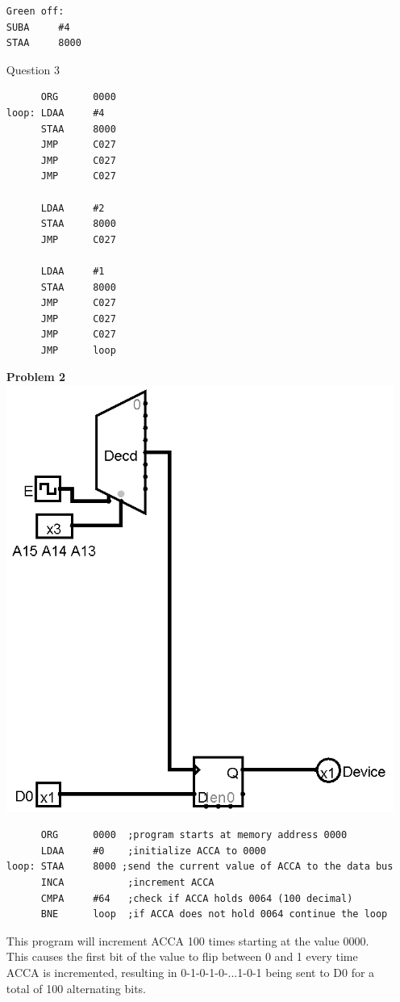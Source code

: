 \documentclass{article}
\begin{document}
\begin{itemize}
\begin{verbatim}
Green off:
SUBA     #4
STAA     8000
\end{verbatim}
	\item [Question 3]\hspace{0pt}\\
\begin{verbatim}
      ORG      0000
loop: LDAA     #4
      STAA     8000
      JMP      C027
      JMP      C027
      JMP      C027

      LDAA     #2
      STAA     8000
      JMP      C027

      LDAA     #1
      STAA     8000
      JMP      C027
      JMP      C027
      JMP      C027
      JMP      loop
\end{verbatim}
	
	\item [\textbf{Problem 2}]\hspace{0pt}\\
	\includegraphics[scale=0.5]{hw8b}
\begin{verbatim}
      ORG      0000  ;program starts at memory address 0000
      LDAA     #0    ;initialize ACCA to 0000
loop: STAA     8000 ;send the current value of ACCA to the data bus
      INCA           ;increment ACCA
      CMPA     #64   ;check if ACCA holds 0064 (100 decimal)
      BNE      loop  ;if ACCA does not hold 0064 continue the loop
\end{verbatim}

This program will increment ACCA 100 times starting at the value 0000. This causes the first bit of the value to flip between 0 and 1 every time ACCA is incremented, resulting in 0-1-0-1-0-...1-0-1 being sent to D0 for a total of 100 alternating bits.

\end{itemize}
\end{document}
